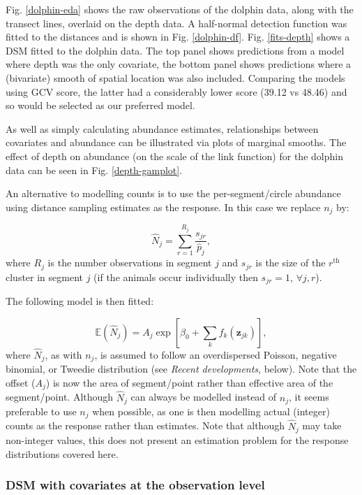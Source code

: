 \documentclass[a4paper,12pt]{article}
\begin{document}
Fig. \ref{dolphin-eda} shows the raw observations of the dolphin data, along with the transect lines, overlaid on the depth data. A half-normal detection function was fitted to the distances and is shown in Fig. \ref{dolphin-df}. Fig. \ref{fits-depth} shows a DSM fitted to the dolphin data. The top panel shows predictions from a model where depth was the only covariate, the bottom panel shows predictions where a (bivariate) smooth of spatial location was also included. Comparing the models using GCV score, the latter had a considerably lower score (39.12 vs 48.46) and so would be selected as our preferred model. 

As well as simply calculating abundance estimates, relationships between covariates and abundance can be illustrated via plots of marginal smooths. The effect of depth on abundance (on the scale of the link function) for the dolphin data can be seen in Fig. \ref{depth-gamplot}. 

An alternative to modelling counts is to use the per-segment/circle abundance using distance sampling estimates as the response. In this case we replace $n_j$ by:

\begin{equation*}
\hat{N}_j = \sum_{r=1}^{R_j} \frac{s_{jr}}{\hat{p}_j},
\end{equation*}
where $R_j$ is the number observations in segment $j$ and $s_{jr}$ is the size of the $r^\text{th}$ cluster in segment $j$ (if the animals occur individually then $s_{jr}=1$, $\forall j,r$). 

The following model is then fitted:

\begin{equation*}
\mathbb{E}(\hat{N}_j) = A_j \exp\left[ \beta_0 + \sum_k f_k\left(\bm{z}_{jk}\right) \right],
\end{equation*}
where $\hat{N}_j$, as with $n_j$, is assumed to follow an overdispersed Poisson, negative binomial, or Tweedie distribution (see \textit{Recent developments}, below). Note that the offset ($A_j$) is now the area of segment/point rather than effective area of the segment/point. Although $\hat{N}_j$ can always be modelled instead of $n_j$, it seems preferable to use $n_j$ when possible, as one is then modelling actual (integer) counts as the response rather than estimates. Note that although $\hat{N}_j$ may take non-integer values, this does not present an estimation problem for the response distributions covered here.

\subsubsection*{DSM with covariates at the observation level}
\end{document}

